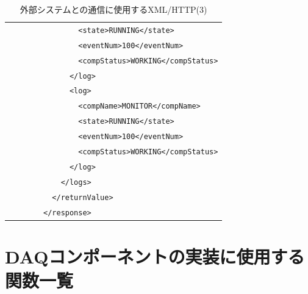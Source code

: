 \documentclass[a4j,10pt,dvips,onecolumn,oneside,final]{jarticle}%
\begin{document}
\begin{table}[htbp]
\begin{center}
{\begin{tabular}{|l|c|c|c|l|}
                  &           &      &                                            & \verb|        <state>RUNNING</state>|\\
                  &           &      &                                            & \verb|        <eventNum>100</eventNum>|\\
                  &           &      &                                            & \verb|        <compStatus>WORKING</compStatus>|\\
                  &           &      &                                            & \verb|      </log>|\\
                  &           &      &                                            & \verb|      <log>|\\
                  &           &      &                                            & \verb|        <compName>MONITOR</compName>|\\
                  &           &      &                                            & \verb|        <state>RUNNING</state>|\\
                  &           &      &                                            & \verb|        <eventNum>100</eventNum>|\\
                  &           &      &                                            & \verb|        <compStatus>WORKING</compStatus>|\\
                  &           &      &                                            & \verb|      </log>|\\
                  &           &      &                                            & \verb|    </logs>|\\
                  &           &      &                                            & \verb|  </returnValue>|\\ 
                  &           &      &                                            & \verb|</response>|\\ \hline

    \end{tabular}
    \caption{外部システムとの通信に使用するXML/HTTP(3)}\label{http3.tab}
}
\end{center}
\end{table}

\newpage
\section{DAQコンポーネントの実装に使用する関数一覧}\label{funclist}
\end{document}
